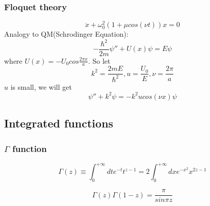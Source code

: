 \subsubsection{Floquet theory}
\begin{equation}
    \ddot{x} + \omega_{0}^{2}(1+\mu cos(\nu t))x = 0
\end{equation}
Analogy to QM(Schrodinger Equation):	
\[
    -\frac{\hbar^{2}}{2m}{\psi''} + U(x)\psi = E\psi
    \]
where $U(x) = -U_{0}cos\frac{2\pi x}{a}$.
So let 
\[
    k^{2} = \frac{2mE}{\hbar^{2}}, u=\frac{U_0}{E}, \nu=\frac{2\pi}{a}
    \]
$u$ is small, we will get   
\[ 
    \psi''+k^{2}\psi = -k^{2}ucos(\nu x)\psi
    \]

\subsection{Integrated functions}
\subsubsection{$\Gamma$ function}
\[\Gamma(z) \equiv \int_{0}^{+\infty}dt e^{-t} t^{z-1} =
2\int_{0}^{+\infty}dx e^{-x^2}x^{2z-1}\]

\[\Gamma(z)\Gamma(1-z) = \frac{\pi}{sin\pi z}\]

